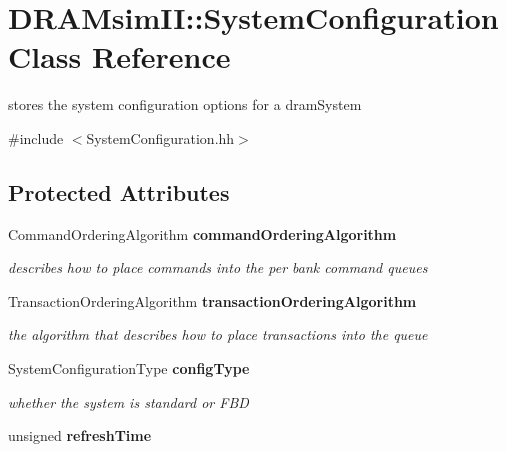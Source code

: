 \section{DRAMsimII::SystemConfiguration Class Reference}
\label{class_d_r_a_msim_i_i_1_1_system_configuration}


stores the system configuration options for a dramSystem  




{\ttfamily \#include $<$SystemConfiguration.hh$>$}

\subsection*{Protected Attributes}
\begin{DoxyCompactItemize}
\item 
CommandOrderingAlgorithm {\bf commandOrderingAlgorithm}\label{class_d_r_a_msim_i_i_1_1_system_configuration_a86c48c5a61c66a2529da7ee18cfbdcf4}

\begin{DoxyCompactList}\small\item\em describes how to place commands into the per bank command queues \item\end{DoxyCompactList}\item 
TransactionOrderingAlgorithm {\bf transactionOrderingAlgorithm}\label{class_d_r_a_msim_i_i_1_1_system_configuration_a2e2639a70d39978c115d08854824ec05}

\begin{DoxyCompactList}\small\item\em the algorithm that describes how to place transactions into the queue \item\end{DoxyCompactList}\item 
SystemConfigurationType {\bf configType}\label{class_d_r_a_msim_i_i_1_1_system_configuration_a2bc2412d43c18091191c64267a6b1a78}

\begin{DoxyCompactList}\small\item\em whether the system is standard or FBD \item\end{DoxyCompactList}\item 
unsigned {\bf refreshTime}\label{class_d_r_a_msim_i_i_1_1_system_configuration_a332e207779eaf2f92bfaf4826faf9ea8}


\end{DoxyCompactItemize}
